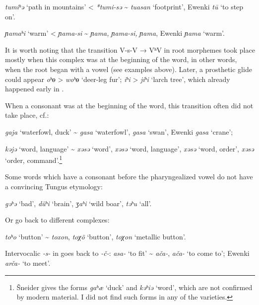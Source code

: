 \documentclass[output=paper,colorlinks,citecolor=brown]{langscibook}
\begin{document}
\ea
    \label{example7.9}
 \textit{tumiʰ{ə}} ‘path in mountains’ < \textit{*tumi-s{ə}} {\textasciitilde}  \textit{tuasan} ‘footprint’, Ewenki \textit{tū} ‘to step on’.
\z

\ea
    \label{example7.10}
 \textit{{ɲ}amaʰi} ‘warm’ < \textit{{ɲ}ama-si} {\textasciitilde}  \textit{{ɲ}ama, {ɲ}ama-si,}  \textit{{ɲ}ama}, Ewenki \textit{{ɲ}ama} ‘warm’. 
\z

It is worth noting that the transition V-s-V → VʰV in root morphemes took place mostly when this complex was at the beginning of the word, in other words, when the root began with a vowel (see examples above). Later, a prosthetic glide could appear \textit{oʰ{ɵ}} > \textit{woʰ{ɵ}} ‘deer-leg fur’; \textit{iʰi} > \textit{jiʰi} ‘larch tree’, which already happened early in .

When a consonant was at the beginning of the word, this transition often did not take place, cf.: 

\ea
    \label{example7.11}
 \textit{gaja} ‘waterfowl, duck’ {\textasciitilde}  \textit{gasa} ‘waterfowl’,  \textit{gasa} ‘swan’, Ewenki \textit{gasa} ‘crane’; 
\z

\ea
    \label{example7.12}
 \textit{k{ə}j{ə}} ‘word, language’ {\textasciitilde}  \textit{x{ə}s{ə}} ‘word’,  \textit{x{ə}s{ə}} ‘word, language’,  \textit{x{ə}s{ə}} ‘word, order’,  \textit{x{ə}s{ə}} ‘order, command’.\footnote{Šneider gives the forms \textit{gaʰæ} ‘duck’ and \textit{k{ə}ʰi{ə}} ‘word’, which are not confirmed by modern material. I did not find such forms in any of the varieties.}
\z

Some words which have a consonant before the pharyngealized vowel do not have a convincing Tungus etymology: 

\ea
    \label{example7.13}
\textit{g{ə}ʰ{ə}} ‘bad’, \textit{düʰi} ‘brain’, \textit{{ʒ}aʰi} ‘wild boar’, \textit{t{ə}ʰu} ‘all’. 
\z

\noindent Or go back to different complexes:

\ea
    \label{example7.14}
 \textit{toʰo} ‘button’ {\textasciitilde}  \textit{toxon},  \textit{toχ\~{o}} ‘button’,  \textit{toχon} ‘metallic button’.
\z

Intervocalic \textit{-s-} in  goes back to \textit{-č-}: \textit{asa-} ‘to fit’ {\textasciitilde}  \textit{ača-},  \textit{ača-} ‘to come to’; Ewenki \textit{arča-} ‘to meet’. 
\end{document}
